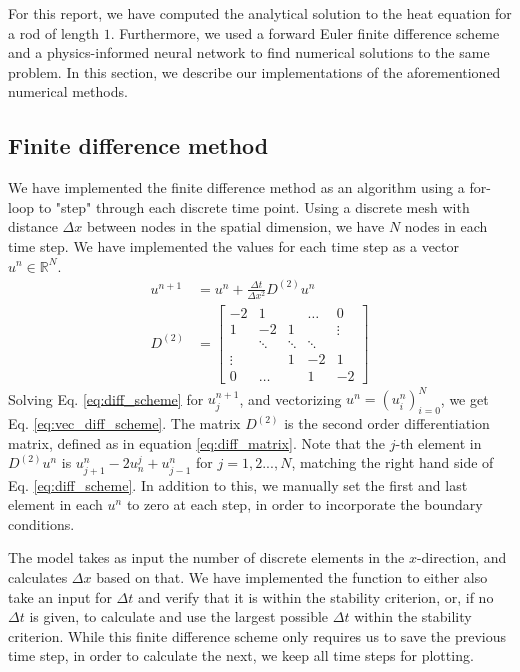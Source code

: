 For this report, we have computed the analytical solution to the heat equation for a rod of length $1$. 
Furthermore, we used a forward Euler finite difference scheme and a physics-informed neural network to find numerical solutions to the same problem. 
In this section, we describe our implementations of the aforementioned numerical methods. 

\subsection{Finite difference method}

We have implemented the finite difference method as an algorithm using a for-loop to "step" through each discrete time point.
Using a discrete mesh with distance $\Delta x$ between nodes in the spatial dimension,
we have $N$ nodes in each time step.
We have implemented the values for each time step as a vector $u^n \in \mathbb{R}^{N}$.
\begin{align}
    \label{eq:vec_diff_scheme}
    u^{n+1} &= u^n + \frac{\Delta t}{\Delta x^2} D^{(2)}u^n \\
    \label{eq:diff_matrix}
    D^{(2)} &= 
    \begin{bmatrix}
    -2  & 1     &       &    \dots    &   0    \\
     1 & -2 & 1 &  &    \vdots    \\
     & \ddots & \ddots & \ddots & \\
     \vdots &     & 1 & -2 & 1 \\
     0&     \dots      &      & 1     & -2
    \end{bmatrix}
\end{align}
Solving Eq. \ref{eq:diff_scheme} for $u_j^{n+1}$, and vectorizing $u^n = (u^n_i)_{i=0}^N$, we get Eq. \ref{eq:vec_diff_scheme}.
The matrix $D^{(2)}$ is the second order differentiation matrix, defined as in equation \ref{eq:diff_matrix}.
Note that the $j$-th element in $D^{(2)}u^n$ is $u_{j+1}^n - 2u_n^j + u_{j-1}^n$ for $j = 1,2...,N$, matching the right hand side of Eq. \ref{eq:diff_scheme}.
In addition to this, we manually set the first and last element in each $u^n$ to zero at each step, in order to incorporate the boundary conditions.

The model takes as input the number of discrete elements in the $x$-direction, and calculates $\Delta x$ based on that.
We have implemented the function to either also take an input for $\Delta t$ and verify that it is within the stability criterion, or, if no $\Delta t$ is given, to calculate and use the largest possible $\Delta t$ within the stability criterion.
While this finite difference scheme only requires us to save the previous time step, in order to calculate the next, we keep all time steps for plotting.

